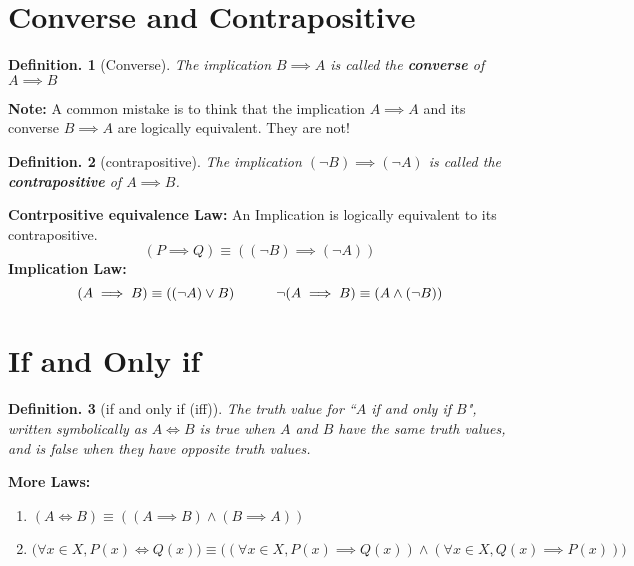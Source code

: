 \documentclass[11pt, a4paper]{memoir}
\theoremstyle{change}
\theoremstyle{plain}
\theoremstyle{nonumberplain}
\newtheorem{definition}{Definition.}
\numberwithin{equation}{section}
\begin{document}
\section{Converse and Contrapositive}
\begin{definition}[Converse]
    The implication $B \implies A$ is called the \textbf{converse} of $A \implies B$
\end{definition}
\textbf{Note: }A common mistake is to think that the implication $A \implies A$ and its converse $B \implies A$ are logically equivalent. They are not!
\begin{definition}[contrapositive]
    The implication $(\neg B) \implies (\neg A)$ is called the \textbf{contrapositive} of $A \implies B$.
\end{definition}
\textbf{Contrpositive equivalence Law:} An Implication is logically equivalent to its contrapositive. $$(P \implies Q) \equiv ((\neg B) \implies (\neg A))$$
\textbf{Implication Law:} $$(A \implies B) \equiv ((\neg A) \vee B) \hspace{7ex} \neg(A \implies B) \equiv (A \wedge (\neg B))$$

\section{If and Only if}
\begin{definition}[if and only if (iff)]
    The truth value for “$A$ if and only if $B$", written symbolically as $A \iff B$ is true when $A$ and $B$ have the 
    same truth values, and is false when they have opposite truth values.
\end{definition}
\textbf{More Laws:} 
\begin{enumerate}
    \item $(A \iff B) \equiv ((A \implies B) \wedge (B \implies A))$
    \item $\big(\forall x \in X, P(x) \iff Q(x)\big) \equiv \big((\forall x \in X, P(x) \implies Q(x)) \wedge (\forall x \in X, Q(x) \implies P(x))\big)$
\end{enumerate}
\end{document}
